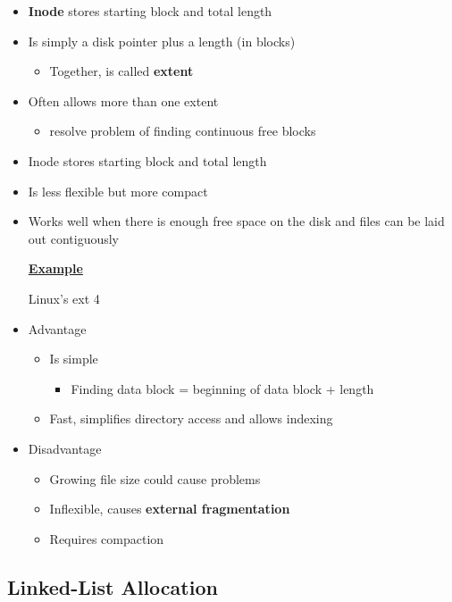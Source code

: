 \documentclass[12pt]{article}
\begin{document}
\begin{itemize}
    \item \textbf{Inode} stores starting block and total length
    \item Is simply a disk pointer plus a length (in blocks)
    \begin{itemize}
        \item Together, is called \textbf{extent}
    \end{itemize}
    \item Often allows more than one extent
    \begin{itemize}
        \item resolve problem of finding continuous free blocks
    \end{itemize}
    \item Inode stores starting block and total length
    \item Is less flexible but more compact
    \item Works well when there is enough free space on the disk and files can be laid out contiguously

    \bigskip

    \underline{\textbf{Example}}

    \bigskip

    Linux's ext 4

    \item Advantage

    \begin{itemize}
        \item Is simple
        \begin{itemize}
            \item Finding data block = beginning of data block + length
        \end{itemize}
        \item Fast, simplifies directory access and allows indexing
    \end{itemize}

    \item Disadvantage
    \begin{itemize}
        \item Growing file size could cause problems
        \item Inflexible, causes \textbf{external fragmentation}
        \item Requires compaction
    \end{itemize}
\end{itemize}

\subsection{Linked-List Allocation}
\end{document}
